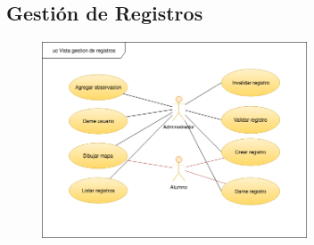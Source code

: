 		\subsection{Gestión de Registros}
			\begin{figure}[H]
			\centering
				\includegraphics[width=0.7\textwidth]{imagenes/DiagramasUML/gestionDeRegistros.png}
				\label{fig:casos-de-uso-tienda}
			\end{figure}

